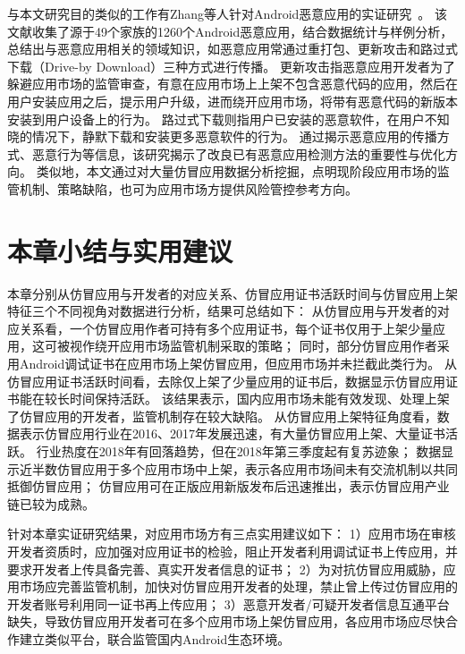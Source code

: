 与本文研究目的类似的工作有Zhang等人针对Android恶意应用的实证研究~\cite{Zhou2012DissectingAM}。
该文献收集了源于49个家族的1260个Android恶意应用，结合数据统计与样例分析，总结出与恶意应用相关的领域知识，如恶意应用常通过重打包、更新攻击和路过式下载（Drive-by Download）三种方式进行传播。
更新攻击指恶意应用开发者为了躲避应用市场的监管审查，有意在应用市场上上架不包含恶意代码的应用，然后在用户安装应用之后，提示用户升级，进而绕开应用市场，将带有恶意代码的新版本安装到用户设备上的行为。
路过式下载则指用户已安装的恶意软件，在用户不知晓的情况下，静默下载和安装更多恶意软件的行为。
通过揭示恶意应用的传播方式、恶意行为等信息，该研究揭示了改良已有恶意应用检测方法的重要性与优化方向。
类似地，本文通过对大量仿冒应用数据分析挖掘，点明现阶段应用市场的监管机制、策略缺陷，也可为应用市场方提供风险管控参考方向。


\section{本章小结与实用建议}
本章分别从仿冒应用与开发者的对应关系、仿冒应用证书活跃时间与仿冒应用上架特征三个不同视角对数据进行分析，结果可总结如下：
从仿冒应用与开发者的对应关系看，一个仿冒应用作者可持有多个应用证书，每个证书仅用于上架少量应用，这可被视作绕开应用市场监管机制采取的策略；
同时，部分仿冒应用作者采用Android调试证书在应用市场上架仿冒应用，但应用市场并未拦截此类行为。
从仿冒应用证书活跃时间看，去除仅上架了少量应用的证书后，数据显示仿冒应用证书能在较长时间保持活跃。
该结果表示，国内应用市场未能有效发现、处理上架了仿冒应用的开发者，监管机制存在较大缺陷。
从仿冒应用上架特征角度看，数据表示仿冒应用行业在2016、2017年发展迅速，有大量仿冒应用上架、大量证书活跃。
行业热度在2018年有回落趋势，但在2018年第三季度起有复苏迹象；
数据显示近半数仿冒应用于多个应用市场中上架，表示各应用市场间未有交流机制以共同抵御仿冒应用；
仿冒应用可在正版应用新版发布后迅速推出，表示仿冒应用产业链已较为成熟。

针对本章实证研究结果，对应用市场方有三点实用建议如下：
1）应用市场在审核开发者资质时，应加强对应用证书的检验，阻止开发者利用调试证书上传应用，并要求开发者上传具备完善、真实开发者信息的证书；
2）为对抗仿冒应用威胁，应用市场应完善监管机制，加快对仿冒应用开发者的处理，禁止曾上传过仿冒应用的开发者账号利用同一证书再上传应用；
3）恶意开发者/可疑开发者信息互通平台缺失，导致仿冒应用开发者可在多个应用市场上架仿冒应用，各应用市场应尽快合作建立类似平台，联合监管国内Android生态环境。
